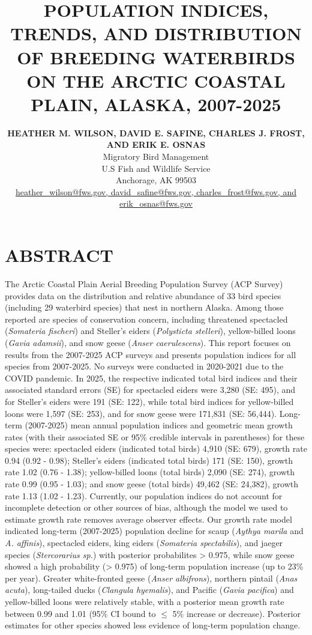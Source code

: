 \documentclass[
]{article}
\title{POPULATION INDICES, TRENDS, AND DISTRIBUTION OF BREEDING
WATERBIRDS ON THE ARCTIC COASTAL PLAIN, ALASKA, 2007-2025}
\author{\textbf{HEATHER M. WILSON, DAVID E. SAFINE, CHARLES J. FROST,
AND ERIK E. OSNAS}\\Migratory Bird Management\\U.S Fish and Wildlife
Service\\Anchorage, AK 99503\\\href{mailto:heather\_wilson@fws.gov,
david\_safine@fws.gov, charles\_frost@fws.gov, and
erik\_osnas@fws.gov}{heather\_wilson@fws.gov, david\_safine@fws.gov,
charles\_frost@fws.gov, and erik\_osnas@fws.gov}}
\date{}
\begin{document}
\maketitle


\section*{ABSTRACT}\label{abstract}

The Arctic Coastal Plain Aerial Breeding Population Survey (ACP Survey)
provides data on the distribution and relative abundance of 33 bird
species (including 29 waterbird species) that nest in northern Alaska.
Among those reported are species of conservation concern, including
threatened spectacled (\emph{Somateria fischeri}) and Steller's eiders
(\emph{Polysticta stelleri}), yellow-billed loons (\emph{Gavia
adamsii}), and snow geese (\emph{Anser caerulescens}). This report
focuses on results from the 2007-2025 ACP surveys and presents
population indices for all species from 2007-2025. No surveys were
conducted in 2020-2021 due to the COVID pandemic. In 2025, the
respective indicated total bird indices and their associated standard
errors (SE) for spectacled eiders were 3,280 (SE: 495), and for
Steller's eiders were 191 (SE: 122), while total bird indices for
yellow-billed loons were 1,597 (SE: 253), and for snow geese were
171,831 (SE: 56,444). Long-term (2007-2025) mean annual population
indices and geometric mean growth rates (with their associated SE or
95\% credible intervals in parentheses) for these species were:
spectacled eiders (indicated total birds) 4,910 (SE: 679), growth rate
0.94 (0.92 - 0.98); Steller's eiders (indicated total birds) 171 (SE:
150), growth rate 1.02 (0.76 - 1.38); yellow-billed loons (total birds)
2,090 (SE: 274), growth rate 0.99 (0.95 - 1.03); and snow geese (total
birds) 49,462 (SE: 24,382), growth rate 1.13 (1.02 - 1.23). Currently,
our population indices do not account for incomplete detection or other
sources of bias, although the model we used to estimate growth rate
removes average observer effects. Our growth rate model indicated
long-term (2007-2025) population decline for scaup (\emph{Aythya marila}
and \emph{A. affinis}), spectacled eiders, king eiders (\emph{Somateria
spectabilis}), and jaeger species (\emph{Stercorarius sp.}) with
posterior probabilites \textgreater{} 0.975, while snow geese showed a
high probability (\textgreater{} 0.975) of long-term population increase
(up to 23\% per year). Greater white-fronted geese (\emph{Anser
albifrons}), northern pintail (\emph{Anas acuta}), long-tailed ducks
(\emph{Clangula hyemalis}), and Pacific (\emph{Gavia pacifica}) and
yellow-billed loons were relatively stable, with a posterior mean growth
rate between 0.99 and 1.01 (95\% CI bound to \(\leq\) 5\% increase or
decrease). Posterior estimates for other species showed less evidence of
long-term population change. \newline
\end{document}
